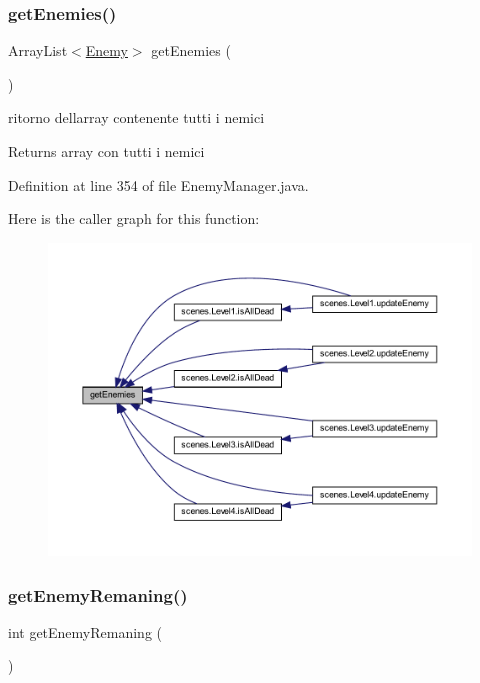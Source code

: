 \subsubsection{\texorpdfstring{get\+Enemies()}{getEnemies()}}
{\footnotesize\ttfamily Array\+List$<$\hyperlink{classenemies_1_1_enemy}{Enemy}$>$ get\+Enemies (\begin{DoxyParamCaption}{ }\end{DoxyParamCaption})}



ritorno dell\textquotesingle{}array contenente tutti i nemici 

\begin{DoxyReturn}{Returns}
array con tutti i nemici 
\end{DoxyReturn}


Definition at line 354 of file Enemy\+Manager.\+java.

Here is the caller graph for this function\+:\nopagebreak
\begin{figure}[H]
\begin{center}
\leavevmode
\includegraphics[width=350pt]{classmanagers_1_1_enemy_manager_aaa1e04fb149c24d658ce085e7ea30c74_icgraph}
\end{center}
\end{figure}
\mbox{\label{classmanagers_1_1_enemy_manager_ad8dae58d52717b5f26d7dc654d1c1361}} 
\subsubsection{\texorpdfstring{get\+Enemy\+Remaning()}{getEnemyRemaning()}}
{\footnotesize\ttfamily int get\+Enemy\+Remaning (\begin{DoxyParamCaption}{ }\end{DoxyParamCaption})}



